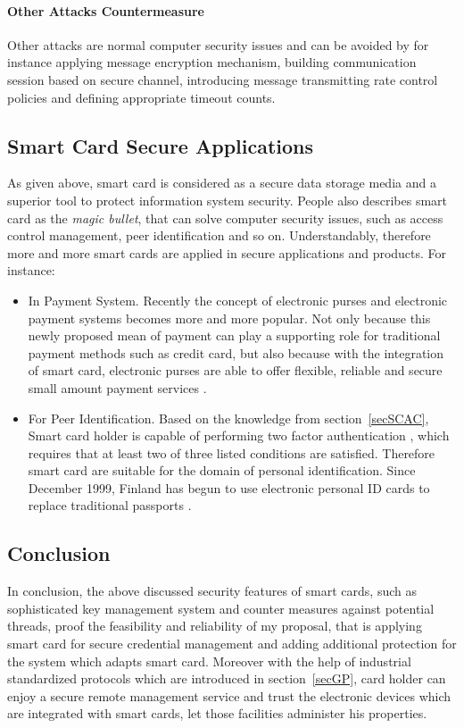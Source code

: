 \paragraph{Other Attacks Countermeasure}
Other attacks are normal computer security issues and can be avoided by for instance applying message encryption mechanism, building communication session based on secure channel, introducing message transmitting rate control policies and defining appropriate timeout counts.
\subsection{Smart Card Secure Applications}
As given above, smart card is considered as a secure data storage media and a superior tool to protect information system security. People also describes smart card as the \emph{magic bullet}, that can solve computer security issues, such as access control management, peer identification and so on. Understandably, therefore more and more smart cards are applied in secure applications and products. For instance:
\begin{itemize}
\item In Payment System. Recently the concept of electronic purses and electronic payment systems becomes more and more popular. Not only because this newly proposed mean of payment can play a supporting role for traditional payment methods such as credit card, but also because with the integration of smart card, electronic purses are able to offer flexible, reliable and secure small amount payment  services \cite{handbook}.
\item For Peer Identification. Based on the knowledge from section~\ref{secSCAC}, Smart card holder is  capable of performing two factor authentication \cite{smart_card_history}, which requires that at least two of three listed conditions are satisfied. Therefore smart card are suitable for the domain of personal identification. Since December 1999, Finland has begun to use electronic personal ID cards to replace traditional passports \cite{handbook}. 
\end{itemize}
\subsection{Conclusion}
In conclusion, the above discussed security features of smart cards, such as sophisticated key management system and counter measures against potential threads, proof the feasibility and reliability of my proposal, that is applying smart card for secure credential management and adding additional protection for the system which adapts smart card. Moreover with the help of industrial standardized protocols which are introduced in section~\ref{secGP}, card holder can enjoy a secure remote management service and trust the electronic devices which are integrated with smart cards, let those facilities administer his properties.  

